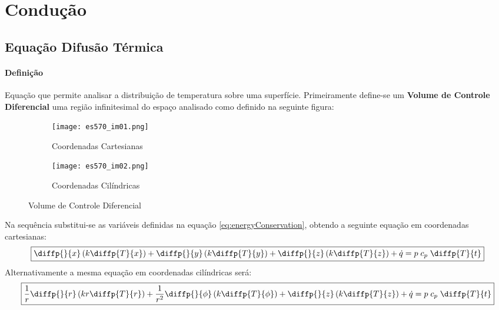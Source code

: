 \documentclass{article}
\begin{document}
    \section{Condução}
        \subsection{Equação Difusão Térmica}
            \paragraph{Definição}Equação que permite analisar a distribuição de temperatura sobre uma superfície. Primeiramente define-se um \textbf{Volume de Controle Diferencial} uma região infinitesimal do espaço analisado como definido na seguinte figura:
                \begin{figure}[H]
                    \begin{subfigure}[t]{0.45\textwidth}
                        \centering
                        \texttt{[image: es570\_im01.png]}
                        \caption{Coordenadas Cartesianas}
                    \end{subfigure}
                    \begin{subfigure}[t]{0.45\textwidth}
                        \centering
                        \texttt{[image: es570\_im02.png]}
                        \caption{Coordenadas Cilíndricas}
                    \end{subfigure}
                    \caption{Volume de Controle Diferencial}
                \end{figure} \noindent
            Na sequência substitui-se as variáveis definidas na equação \ref{eq:energyConservation}, obtendo a seguinte equação em coordenadas cartesianas:
                \begin{equation}
                    \boxed{
                        \diffp{}{x}\left(k\diffp{T}{x}\right) + 
                        \diffp{}{y}\left(k\diffp{T}{y}\right) + 
                        \diffp{}{z}\left(k\diffp{T}{z}\right) + 
                        \dot{q} = 
                        p\;c_{p}\;\diffp{T}{t}
                    }\label{eq.DifusionCartesian}
                \end{equation}
            Alternativamente a mesma equação em coordenadas cilíndricas será:
                \begin{equation}
                    \boxed{
                        \frac{1}{r}\diffp{}{r}\left(kr\diffp{T}{r}\right) + 
                        \frac{1}{r^2}\diffp{}{\phi}\left(k\diffp{T}{\phi}\right) + 
                        \diffp{}{z}\left(k\diffp{T}{z}\right) + 
                        \dot{q} = 
                        p\;c_{p}\;\diffp{T}{t}
                    }\label{eq.DifusionCilinder}
                \end{equation}
\end{document}
